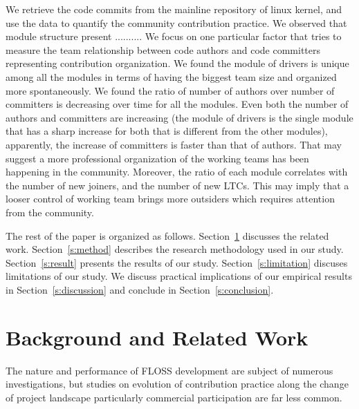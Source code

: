\documentclass{sig-alternate-05-2015}
\begin{document}
We retrieve the code commits from the mainline repository of linux kernel, and 
use the data to quantify the community contribution practice.
We observed that module structure present ..........
We focus on one particular factor that tries to measure the team
relationship between code authors and code committers representing contribution
organization. We found the module of drivers is unique among all the modules 
in terms of having the biggest team size and organized more spontaneously. %
We found the ratio
of number of authors over number of committers is decreasing over time for all the modules.
Even both the number of authors and committers are increasing (the module of 
drivers is the single module that has a sharp increase for both that is different
from the other modules), apparently, 
the increase of committers is faster than that of authors.
That may suggest a more professional organization of the working teams 
has been happening in the community.
Moreover, the ratio of each module correlates with the number of new joiners,
and the number of new LTCs. This may imply that a looser control of working team
brings more outsiders which requires attention from the community.

The rest of the paper is organized as follows. Section~\ref{s:related} 
discusses the related work. Section~\ref{s:method} describes the research 
methodology used in our study. Section~\ref{s:result} presents the results 
of our study. Section~\ref{s:limitation} discuses limitations of our study. 
We discuss practical implications of our empirical results in Section~\ref{s:discussion} 
and conclude in Section~\ref{s:conclusion}.

\section{Background and Related Work}\label{s:related}

The nature and performance of FLOSS development are subject of
numerous investigations, but studies on evolution of contribution practice
along the change of project landscape particularly commercial participation
 are far less common.
\end{document}
